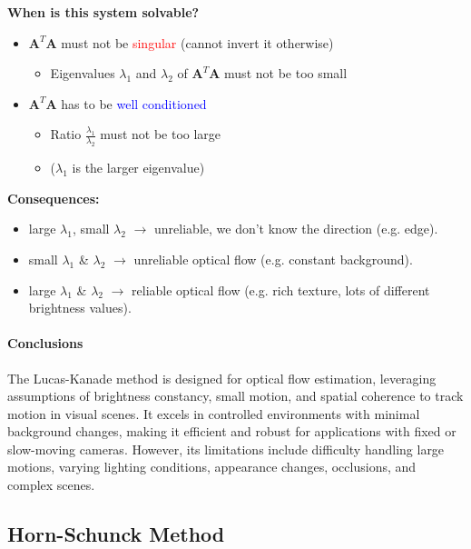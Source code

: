 \documentclass{article}
\begin{document}
\begin{multicols}{2}
	\textbf{When is this system solvable?}
	\begin{itemize}
		\item \( \mathbf{A}^T\mathbf{A} \) must not be \textcolor{red}{singular} (cannot invert it otherwise)
		      \begin{itemize}
			      \item Eigenvalues \( \lambda_1 \) and \( \lambda_2 \) of \( \mathbf{A}^T\mathbf{A} \) must not be too small
		      \end{itemize}
		\item \( \mathbf{A}^T\mathbf{A} \) has to be \textcolor{blue}{well conditioned}
		      \begin{itemize}
			      \item Ratio \( \frac{\lambda_1}{\lambda_2} \) must not be too large
			      \item (\( \lambda_1 \) is the larger eigenvalue)
		      \end{itemize}
	\end{itemize}

	\textbf{Consequences:}
	\begin{itemize}
		\item large \( \lambda_1 \), small \( \lambda_2 \) \(\rightarrow\) unreliable, we don't know the direction (e.g. edge).
		\item small \( \lambda_1 \) \& \( \lambda_2 \)  \(\rightarrow\) unreliable optical flow (e.g. constant background).
		\item large \( \lambda_1 \) \& \( \lambda_2 \) \(\rightarrow\) reliable optical flow (e.g. rich texture, lots of different brightness values).
	\end{itemize}



	\paragraph{Conclusions}

	The Lucas-Kanade method is designed for optical flow estimation, leveraging assumptions of brightness constancy, small motion, and spatial coherence to track motion in visual scenes.
	It excels in controlled environments with minimal background changes, making it efficient and robust for applications with fixed or slow-moving cameras.
	However, its limitations include difficulty handling large motions, varying lighting conditions, appearance changes, occlusions, and complex scenes.


	\subsection{Horn-Schunck Method}

\end{multicols}
\end{document}
